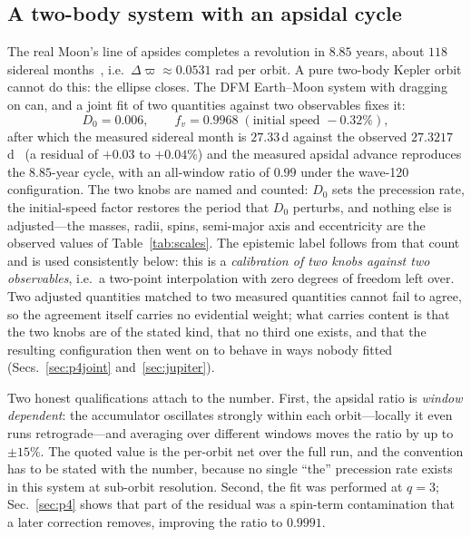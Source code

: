 \documentclass[aps,reprint,amsmath,amssymb,nofootinbib,superscriptaddress,floatfix]{revtex4-2}
\begin{document}
\subsection{A two-body system with an apsidal cycle}
\label{sec:p3fit}

The real Moon's line of apsides completes a revolution in $8.85$
years, about $118$ sidereal
months~\cite{ExplSup2013,NASAFact}, i.e.\ $\Delta\varpi\approx0.0531$
rad per orbit.
A pure two-body Kepler orbit cannot do this: the ellipse closes.
The DFM Earth--Moon system with dragging on can, and a joint fit of two
quantities against two observables fixes it:
\begin{equation}
  D_0 = 0.006, \qquad
  f_{v} = 0.9968 \;(\text{initial speed } -0.32\%),
  \label{eq:fit}
\end{equation}
after which the measured sidereal month is $27.33$\,d against the
observed $27.3217$\,d~\cite{NASAFact} (a residual of $+0.03$ to
$+0.04\%$) and the
measured apsidal advance reproduces the $8.85$-year cycle, with an
all-window ratio of $0.99$ under the wave-120 configuration.
The two knobs are named and counted: $D_0$ sets the precession rate,
the initial-speed factor restores the period that $D_0$ perturbs, and
nothing else is adjusted---the masses, radii, spins, semi-major axis
and eccentricity are the observed values of Table~\ref{tab:scales}.
The epistemic label follows from that count and is used consistently
below: this is a \emph{calibration of two knobs against two
observables}, i.e.\ a two-point interpolation with zero degrees of
freedom left over.
Two adjusted quantities matched to two measured quantities cannot fail
to agree, so the agreement itself carries no evidential weight; what
carries content is that the two knobs are of the stated kind, that no
third one exists, and that the resulting configuration then went on to
behave in ways nobody fitted (Secs.~\ref{sec:p4joint}
and~\ref{sec:jupiter}).

Two honest qualifications attach to the number.
First, the apsidal ratio is \emph{window dependent}: the accumulator
oscillates strongly within each orbit---locally it even runs
retrograde---and averaging over different windows moves the ratio by
up to $\pm15\%$.
The quoted value is the per-orbit net over the full run, and the
convention has to be stated with the number, because no single
``the'' precession rate exists in this system at sub-orbit resolution.
Second, the fit was performed at $q=3$; Sec.~\ref{sec:p4} shows that
part of the residual was a spin-term contamination that a later
correction removes, improving the ratio to $0.9991$.
\end{document}
